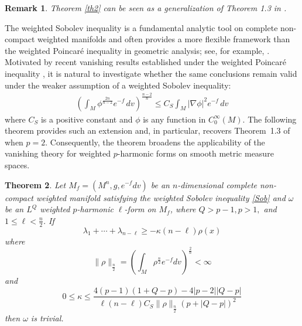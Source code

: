 \documentclass[10pt,a4paper]{amsart}
\newtheorem{theorem}{\indent\sc Theorem}[section]
\newtheorem{remark}[theorem]{\indent\sc Remark}
\numberwithin{equation}{section}
\begin{document}
\begin{remark}
	Theorem \ref{th2} can be seen as a generalization of Theorem 1.3 in \cite{DDH25}.
\end{remark}
The weighted Sobolev inequality is a fundamental analytic tool on complete non-compact weighted manifolds and often provides a more flexible framework than the weighted Poincar\'e inequality in geometric analysis; see, for example, \cite{Hebey99,SaloffCoste02}. Motivated by recent vanishing results established under the weighted Poincar\'e inequality \cite{DS19,DDH25}, it is natural to investigate whether the same conclusions remain valid under the weaker assumption of a weighted Sobolev inequality:
\begin{align}\label{Sob}
	\left(
	\int_M \phi^{\frac{2n}{n-2}} e^{-f}\,dv
	\right)^{\frac{n-2}{n}}
	\le
	C_S \int_M |\nabla \phi|^2 e^{-f}\,dv
\end{align} 
where $C_S$ is a positive constant and $\phi$ is any function in $C^{\infty}_0(M)$. The following theorem provides such an extension and, in particular, recovers Theorem~1.3 of \cite{DDH25} when $p=2$. Consequently, the theorem broadens the applicability of the vanishing theory for weighted $p$-harmonic forms on smooth metric measure spaces.


\begin{theorem}\label{th3}
	Let $M_f=(M^n,g,e^{-f}dv)$ be an $n$-dimensional complete non-compact weighted manifold satisfying the weighted Sobolev inequality \eqref{Sob} and $\omega$ be an $L^Q$ weighted $p$-harmonic $\ell$-form on $M_f$, where $Q>p-1,p>1,$ and $1\le \ell < \frac{n}{2}$. 
	If	$$\lambda_1+\cdots+\lambda_{n-\ell}\ge -\kappa(n-\ell)\rho(x)	$$
	where $$\|\rho\|_{\frac{n}{2}}=\left(\int_M \rho^{\frac{n}{2}}e^{-f}dv \right)^{\frac{2}{n}}<\infty$$
	 and $$0\le \kappa\le \frac{4(p-1)(1+Q-p)-4|p-2||Q-p|}{\ell (n-\ell)C_S \|\rho\|_{\frac{n}{2}}(p+|Q-p|)^2}$$
	then $\omega$ is trivial.
\end{theorem}
\end{document}
